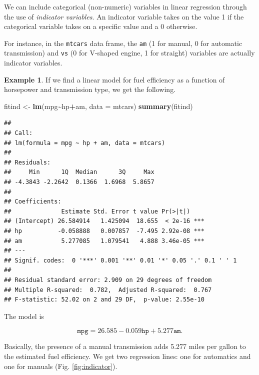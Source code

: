 \documentclass[
]{book}
\newenvironment{Shaded}{\begin{snugshade}}{\end{snugshade}}
\newcommand{\AttributeTok}[1]{\textcolor[rgb]{0.13,0.29,0.53}{#1}}
\newcommand{\FunctionTok}[1]{\textcolor[rgb]{0.13,0.29,0.53}{\textbf{#1}}}
\newcommand{\NormalTok}[1]{#1}
\newcommand{\OtherTok}[1]{\textcolor[rgb]{0.56,0.35,0.01}{#1}}
\newcommand{\SpecialCharTok}[1]{\textcolor[rgb]{0.81,0.36,0.00}{\textbf{#1}}}
\theoremstyle{definition}
\theoremstyle{definition}
\newtheorem{example}{Example}[chapter]
\theoremstyle{definition}
\theoremstyle{definition}
\theoremstyle{remark}
\begin{document}
We can include categorical (non-numeric) variables in linear regression through the use of \emph{indicator variables}. An indicator variable takes on the value 1 if the categorical variable takes on a specific value and a 0 otherwise.

For instance, in the \texttt{mtcars} data frame, the \texttt{am} (1 for manual, 0 for automatic transmission) and \texttt{vs} (0 for V-shaped engine, 1 for straight) variables are actually indicator variables.

\begin{examplebox}

\begin{example}
If we find a linear model for fuel efficiency as a function of horsepower and transmission type, we get the following.

\begin{Shaded}
\begin{Highlighting}[]
\NormalTok{fitind }\OtherTok{\textless{}{-}} \FunctionTok{lm}\NormalTok{(mpg}\SpecialCharTok{\textasciitilde{}}\NormalTok{hp}\SpecialCharTok{+}\NormalTok{am, }\AttributeTok{data =}\NormalTok{ mtcars)}
\FunctionTok{summary}\NormalTok{(fitind)}
\end{Highlighting}
\end{Shaded}

\begin{verbatim}
## 
## Call:
## lm(formula = mpg ~ hp + am, data = mtcars)
## 
## Residuals:
##     Min      1Q  Median      3Q     Max 
## -4.3843 -2.2642  0.1366  1.6968  5.8657 
## 
## Coefficients:
##              Estimate Std. Error t value Pr(>|t|)    
## (Intercept) 26.584914   1.425094  18.655  < 2e-16 ***
## hp          -0.058888   0.007857  -7.495 2.92e-08 ***
## am           5.277085   1.079541   4.888 3.46e-05 ***
## ---
## Signif. codes:  0 '***' 0.001 '**' 0.01 '*' 0.05 '.' 0.1 ' ' 1
## 
## Residual standard error: 2.909 on 29 degrees of freedom
## Multiple R-squared:  0.782,  Adjusted R-squared:  0.767 
## F-statistic: 52.02 on 2 and 29 DF,  p-value: 2.55e-10
\end{verbatim}

The model is

\[\texttt{mpg}=26.585-0.059\texttt{hp}+5.277\texttt{am}.\]

Basically, the presence of a manual transmission adds 5.277 miles per gallon to the estimated fuel efficiency. We get two regression lines: one for automatics and one for manuals (Fig. \ref{fig:indicator}).
\end{example}

\end{examplebox}
\end{document}
